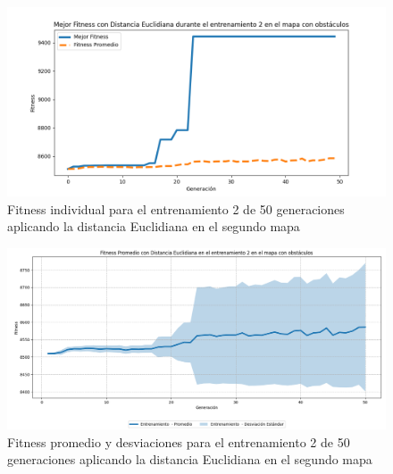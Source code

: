 \documentclass[lettersize, journal]{IEEEtran}
\begin{document}
\begin{figure}[H]
    \centering
    \includegraphics[width=0.9 \linewidth]{Euclidiana/Mapa2/Fitness_2_Map2_Eucli_50Gen.png}
    \caption{Fitness individual para el entrenamiento 2 de 50 generaciones aplicando la distancia Euclidiana en el segundo mapa}
    \label{fig:eucli_2_50_m2}
\end{figure}
\begin{figure}[H]
    \centering
    \includegraphics[width=0.9 \linewidth]{Euclidiana/Mapa2/Fitness_2_Map2_Eucli_50Gen_Sombra.png}
    \caption{Fitness promedio y desviaciones para el entrenamiento 2 de 50 generaciones aplicando la distancia Euclidiana en el segundo mapa}
    \label{fig:eucli_2_50_sombra_m2}
\end{figure}
\end{document}
